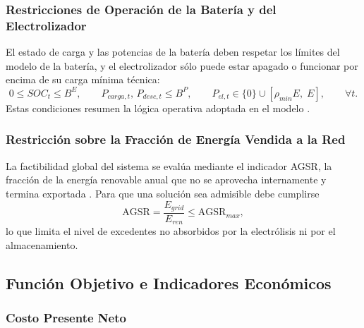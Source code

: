 \subsubsection{Restricciones de Operación de la Batería y del Electrolizador}

El estado de carga y las potencias de la batería deben respetar los límites del modelo de la batería, y el electrolizador sólo puede estar apagado o funcionar por encima de su carga mínima técnica:
\begin{equation}
0\leq SOC_t\leq B^{E},\qquad
P_{carga,t},\,P_{desc,t}\leq B^{P},\qquad
P_{el,t}\in\{0\}\cup\left[\rho_{min}E,\;E\right],\qquad\forall t.
\end{equation}
Estas condiciones resumen la lógica operativa adoptada en el modelo \cite{Li2024WPEB}.

\subsubsection{Restricción sobre la Fracción de Energía Vendida a la Red}

La factibilidad global del sistema se evalúa mediante el indicador AGSR, la fracción de la energía renovable anual que no se aprovecha internamente y termina exportada \cite{Li2024WPEB}. Para que una solución sea admisible debe cumplirse
\begin{equation}
\mathrm{AGSR}=\frac{E_{grid}}{E_{ren}}\leq\mathrm{AGSR}_{max},
\end{equation}
lo que limita el nivel de excedentes no absorbidos por la electrólisis ni por el almacenamiento.

\subsection{Función Objetivo e Indicadores Económicos}

\subsubsection{Costo Presente Neto}

